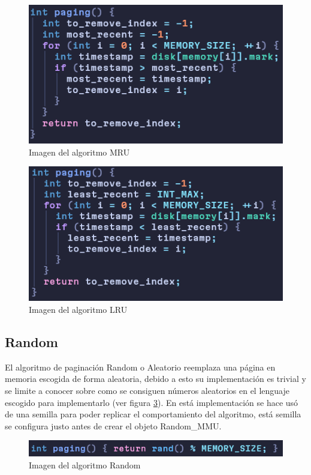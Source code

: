 \documentclass{report}
\begin{document}
\begin{figure}[h]
	\centering
	\includegraphics[width=0.8\linewidth]{figuras/mru.png}
	\caption{Imagen del algoritmo MRU}
	\label{fig:mru}
\end{figure}

\begin{figure}[h]
	\centering
	\includegraphics[width=0.8\linewidth]{figuras/lru.png}
	\caption{Imagen del algoritmo LRU }
	\label{fig:lru}
\end{figure}
  

\subsection{Random}

El algoritmo de paginación Random o Aleatorio reemplaza una página en memoria escogida de forma aleatoria, debido a esto su implementación es trivial y se limite a conocer sobre como se consiguen números aleatorios en el lenguaje escogido para implementarlo (ver figura \ref{fig:random}). En está implementación se hace usó de una semilla para poder replicar el comportamiento del algoritmo, está semilla se configura justo antes de crear el objeto Random\_MMU.

\begin{figure}[h]
	\centering
	\includegraphics[width=0.8\linewidth]{figuras/random.png}
	\caption{Imagen del algoritmo Random }
	\label{fig:random}
\end{figure}
\end{document}
